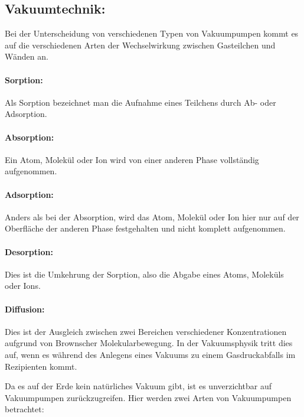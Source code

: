 \subsection{Vakuumtechnik:}
Bei der Unterscheidung von verschiedenen Typen von Vakuumpumpen kommt es auf die verschiedenen Arten der
Wechselwirkung zwischen Gasteilchen und Wänden an.

\paragraph{Sorption:}
Als Sorption bezeichnet man die Aufnahme eines Teilchens durch Ab- oder Adsorption.

\paragraph{Absorption:}
Ein Atom, Molekül oder Ion wird von einer anderen Phase vollständig
aufgenommen.

\paragraph{Adsorption:}
Anders als bei der Absorption, wird das Atom, Molekül oder Ion hier nur auf der Oberfläche der anderen Phase
festgehalten und nicht komplett aufgenommen.

\paragraph{Desorption:}
Dies ist die Umkehrung der Sorption, also die Abgabe eines Atoms, Moleküls oder Ions.

 \paragraph{Diffusion:}
 Dies ist der Ausgleich zwischen zwei Bereichen verschiedener Konzentrationen
 aufgrund von Brownscher Molekularbewegung. In der Vakuumsphysik tritt dies auf, wenn es während des Anlegens eines
 Vakuums zu einem Gasdruckabfalls im Rezipienten kommt.

 Da es auf der Erde kein natürliches Vakuum gibt, ist es unverzichtbar auf Vakuumpumpen zurückzugreifen. Hier werden
 zwei Arten von Vakuumpumpen betrachtet:

